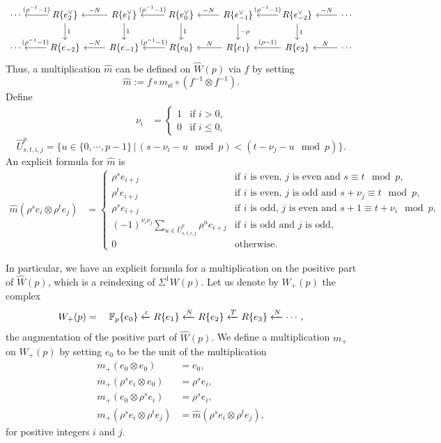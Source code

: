 \[
\begin{tikzcd}%
%
\cdots &
R\{e_{2}^\vee\} \arrow[l, "(\rho^{-1}-1)" '] \arrow[d, "1"] &
R\{e_{1}^\vee\} \arrow[l, "-N" '] \arrow[d, "1"] &
R\{e_0^\vee\} \arrow[l, "(\rho^{-1}-1)" '] \arrow[d, "1"] &
R\{e_{-1}^\vee\} \arrow[l, "-N" '] \arrow[d, "-\rho"] &
R\{e_{-2}^\vee\} \arrow[l, "(\rho^{-1}-1)" '] \arrow[d, "1"]&
\cdots \arrow[l, "-N" '] \\
%
\cdots &
R\{e_{-2}\} \arrow[l, "(\rho^{-1}-1)" '] &
R\{e_{-1}\} \arrow[l, "-N" '] &
R\{e_0\} \arrow[l, "(\rho^{-1}-1)" '] &
R\{e_{1}\} \arrow[l, "N" '] &
R\{e_{2}\} \arrow[l, "(\rho-1)" '] &
\cdots \arrow[l, "N" ']
\end{tikzcd}
\]
Thus, a multiplication $\widehat m$ can be defined on $\widehat W(p)$ via $f$ by setting
\[
\widehat m:=f\circ m_{\text{st}}\circ (f^{-1}\otimes f^{-1}).
\]
Define
\begin{align*}
	\nu_i&= \begin{cases}
	1 & \text{if $i>0$,}
	\\
	0 &\text{if $i\leq 0$,}
	\end{cases}
\end{align*}
\[
\widehat U^p_{s,t,i,j}=\{u\in\{0,\cdots,p-1\}\, |\,  (s-\nu_i-u \mod p) < (t-\nu_j-u \mod p)\}.
\]
An explicit formula for $\widehat m$ is
\begin{align*}
	\widehat m(\rho^s  e_i\otimes \rho^t e_j)&= \begin{cases}
	\rho^s  e_{i+j}& \text{if $i$ is even, $j$ is even and $s\equiv t \mod p$,}
	\\
	\rho^t e_{i+j}& \text{if $i$ is even, $j$ is odd and $s+\nu_j \equiv t \mod p$,}
	\\
	\rho^s e_{i+j}& \text{if $i$ is odd, $j$ is even and $s+1\equiv t+\nu_i \mod p$,}
	\\
	(-1)^{\nu_i\nu_j}\sum_{u\in \widehat U^p_{s,t,i,j}}\rho^u e_{i+j} & \text{if $i$ is odd and $j$ is odd,}
	\\
	0&\text{otherwise.}
	\end{cases}
\end{align*}

In particular, we have an explicit formula for a multiplication on the positive part of $\widehat W(p)$, which is a reindexing of $\Sigma^1 W(p)$. Let us denote by $W_+(p)$ the complex
\[
W_+(p) =\quad  {\mathbb{F}_p}\{e_0\} \xleftarrow{\varepsilon} R\{e_1\} \xleftarrow{N} R\{e_2\} \xleftarrow{T} R\{e_3\} \xleftarrow{N} \cdots,
\]
the augmentation of the positive part of $\widehat W(p)$. We define a multiplication $m_+$ on $W_+(p)$ by setting $e_0$ to be the unit of the multiplication %
\begin{align*}
m_+(e_0\otimes e_0)&= e_0, \\
m_+(\rho^s e_i\otimes e_0)&= \rho^s e_i, \\
m_+(e_0\otimes \rho^s e_i)&= \rho^s e_i, \\
m_+(\rho^s e_i\otimes \rho^t e_j)&= \widehat m(\rho^s e_i\otimes \rho^t e_j),
\end{align*}
for positive integers $i$ and $j$.

